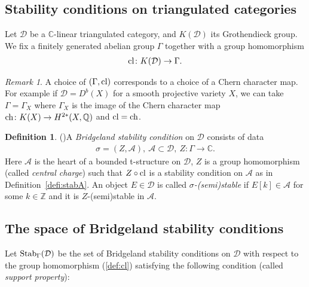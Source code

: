 \documentclass[11pt]{amsart}
\theoremstyle{plain}
\theoremstyle{definition}
\newtheorem{defi}[thm]{Definition}
\theoremstyle{remark}
\newtheorem{rmk}[thm]{Remark}
\newcommand{\aA}{\mathcal{A}}
\newcommand{\dD}{\mathcal{D}}
\newcommand{\ch}{\mathop{\rm ch}\nolimits}
\newcommand{\Stab}{\mathop{\rm Stab}\nolimits}
\newcommand{\cl}{\mathop{\rm cl}\nolimits}
\begin{document}
\subsection{Stability conditions on triangulated categories}
Let $\dD$ be a $\mathbb{C}$-linear triangulated category, 
and $K(\dD)$ its Grothendieck group. 
We fix a finitely generated abelian group $\Gamma$ together with 
a group homomorphism
\begin{align}\label{def:cl}
\cl \colon K(\dD) \to \Gamma.
\end{align}
\begin{rmk}\label{rmk:cl}
A choice of $(\Gamma, \cl)$ 
corresponds to a 
choice of a Chern character map. 
For example if $\dD=D^b(X)$ for a smooth 
projective variety $X$, 
we can take $\Gamma=\Gamma_X$ 
where $\Gamma_X$ is the image of 
the Chern character map 
$\ch \colon K(X) \to H^{2\ast}(X, \mathbb{Q})$
and $\cl=\ch$. 
\end{rmk}

\begin{defi}(\cite{Brs1})\label{def:Bstab}
A \textit{Bridgeland stability condition} on $\dD$ consists 
of data
\begin{align*}
\sigma=(Z, \aA), \ \aA \subset \dD, \ Z \colon \Gamma \to \mathbb{C}.
\end{align*}
Here $\aA$ is the heart of a 
bounded t-structure on $\dD$, 
$Z$ is a group homomorphism (called
\textit{central charge})
such that $Z \circ \cl$ is a stability condition on 
$\aA$ as in Definition~\ref{defi:stabA}. 
An object $E \in \dD$ is called
\textit{$\sigma$-(semi)stable} 
if $E[k] \in \aA$ for some $k \in \mathbb{Z}$ and it 
is $Z$-(semi)stable in $\aA$. 
\end{defi}



\subsection{The space of Bridgeland stability conditions}\label{subsec:space}
Let $\Stab_{\Gamma}(\dD)$ be 
the set of Bridgeland stability conditions 
on $\dD$ with respect to the group homomorphism 
(\ref{def:cl})
satisfying the 
following condition (called \textit{support property}): 
\end{document}
